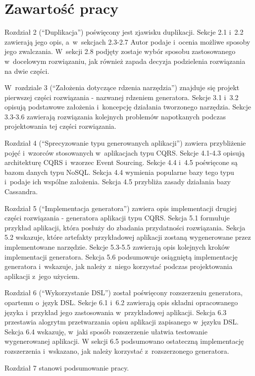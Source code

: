 \section{Zawartość pracy}

Rozdział 2 (``Duplikacja'') poświęcony jest zjawisku duplikacji.
Sekcje 2.1 i~2.2 zawierają jego opis, a~w~sekcjach 2.3-2.7 Autor podaje i~ocenia możliwe sposoby jego zwalczania.
W~sekcji 2.8 podjęty zostaje wybór sposobu zastosowanego w~docelowym rozwiązaniu, jak również zapada decyzja podzielenia rozwiązania na dwie części.

W~rozdziale 3 (``Założenia dotyczące rdzenia narzędzia'') znajduje się projekt pierwszej części rozwiązania - nazwanej rdzeniem generatora.
Sekcje 3.1 i~3.2 opisują podstawowe założenia i~koncepcję działania tworzonego narzędzia.
Sekcje 3.3-3.6 zawierają rozwiązania kolejnych problemów napotkanych podczas projektowania tej części rozwiązania.

Rozdział 4 (``Sprecyzowanie typu generowanych aplikacji'') zawiera przybliżenie pojęć i~wzorców stosowanych w~aplikacjach typu CQRS.
Sekcje 4.1-4.3 opisują architekturę CQRS i~wzorzec Event Sourcing.
Sekcje 4.4 i~4.5 poświęcone są bazom danych typu NoSQL.
Sekcja 4.4 wymienia popularne bazy tego typu i~podaje ich wspólne założenia.
Sekcja 4.5 przybliża zasady działania bazy Cassandra.

Rozdział 5 (``Implementacja generatora'') zawiera opis implementacji drugiej części rozwiązania - generatora aplikacji typu CQRS.
Sekcja 5.1 formułuje przykład aplikacji, która posłuży do zbadania przydatności rozwiązania.
Sekcja 5.2 wskazuje, które artefakty przykładowej aplikacji zostaną wygenerowane przez implementowane narzędzie.
Sekcje 5.3-5.5 zawierają opis kolejnych kroków implementacji generatora.
Sekcja 5.6 podsumowuje osiągniętą implementację generatora i~wskazuje, jak należy z~niego korzystać podczas projektowania aplikacji z~jego użyciem.

Rozdział 6 (``Wykorzystanie DSL'') został poświęcony rozszerzeniu generatora, opartemu o~język DSL.
Sekcje 6.1 i~6.2 zawierają opis składni opracowanego języka i~przykład jego zastosowania w~przykładowej aplikacji.
Sekcja 6.3 przestawia alogrytm przetwarzania opisu aplikacji zapisanego w~języku DSL.
Sekcja 6.4 wskazuję, w~jaki sposób rozszerzenie ułatwia testowanie wygenerowanej aplikacji.
W sekcji 6.5 podsumowano ostateczną implementację rozszerzenia i~wskazano, jak należy korzystać z~rozszerzonego generatora.

Rozdział 7 stanowi podsumowanie pracy.
